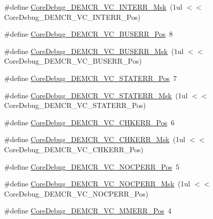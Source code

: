 \begin{DoxyCompactItemize}
\#define \hyperlink{group__CMSIS__CM3__CoreDebug_gad6815d8e3df302d2f0ff2c2c734ed29a}{Core\+Debug\+\_\+\+D\+E\+M\+C\+R\+\_\+\+V\+C\+\_\+\+I\+N\+T\+E\+R\+R\+\_\+\+Msk}~(1ul $<$$<$ Core\+Debug\+\_\+\+D\+E\+M\+C\+R\+\_\+\+V\+C\+\_\+\+I\+N\+T\+E\+R\+R\+\_\+\+Pos)
\item 
\#define \hyperlink{group__CMSIS__CM3__CoreDebug_gab8e3d8f0f9590a51bbf10f6da3ad6933}{Core\+Debug\+\_\+\+D\+E\+M\+C\+R\+\_\+\+V\+C\+\_\+\+B\+U\+S\+E\+R\+R\+\_\+\+Pos}~8
\item 
\#define \hyperlink{group__CMSIS__CM3__CoreDebug_ga9d29546aefe3ca8662a7fe48dd4a5b2b}{Core\+Debug\+\_\+\+D\+E\+M\+C\+R\+\_\+\+V\+C\+\_\+\+B\+U\+S\+E\+R\+R\+\_\+\+Msk}~(1ul $<$$<$ Core\+Debug\+\_\+\+D\+E\+M\+C\+R\+\_\+\+V\+C\+\_\+\+B\+U\+S\+E\+R\+R\+\_\+\+Pos)
\item 
\#define \hyperlink{group__CMSIS__CM3__CoreDebug_ga16f0d3d2ce1e1e8cd762d938ac56c4ac}{Core\+Debug\+\_\+\+D\+E\+M\+C\+R\+\_\+\+V\+C\+\_\+\+S\+T\+A\+T\+E\+R\+R\+\_\+\+Pos}~7
\item 
\#define \hyperlink{group__CMSIS__CM3__CoreDebug_gaa38b947d77672c48bba1280c0a642e19}{Core\+Debug\+\_\+\+D\+E\+M\+C\+R\+\_\+\+V\+C\+\_\+\+S\+T\+A\+T\+E\+R\+R\+\_\+\+Msk}~(1ul $<$$<$ Core\+Debug\+\_\+\+D\+E\+M\+C\+R\+\_\+\+V\+C\+\_\+\+S\+T\+A\+T\+E\+R\+R\+\_\+\+Pos)
\item 
\#define \hyperlink{group__CMSIS__CM3__CoreDebug_ga10fc7c53bca904c128bc8e1a03072d50}{Core\+Debug\+\_\+\+D\+E\+M\+C\+R\+\_\+\+V\+C\+\_\+\+C\+H\+K\+E\+R\+R\+\_\+\+Pos}~6
\item 
\#define \hyperlink{group__CMSIS__CM3__CoreDebug_ga2f98b461d19746ab2febfddebb73da6f}{Core\+Debug\+\_\+\+D\+E\+M\+C\+R\+\_\+\+V\+C\+\_\+\+C\+H\+K\+E\+R\+R\+\_\+\+Msk}~(1ul $<$$<$ Core\+Debug\+\_\+\+D\+E\+M\+C\+R\+\_\+\+V\+C\+\_\+\+C\+H\+K\+E\+R\+R\+\_\+\+Pos)
\item 
\#define \hyperlink{group__CMSIS__CM3__CoreDebug_gac9d13eb2add61f610d5ced1f7ad2adf8}{Core\+Debug\+\_\+\+D\+E\+M\+C\+R\+\_\+\+V\+C\+\_\+\+N\+O\+C\+P\+E\+R\+R\+\_\+\+Pos}~5
\item 
\#define \hyperlink{group__CMSIS__CM3__CoreDebug_ga03ee58b1b02fdbf21612809034562f1c}{Core\+Debug\+\_\+\+D\+E\+M\+C\+R\+\_\+\+V\+C\+\_\+\+N\+O\+C\+P\+E\+R\+R\+\_\+\+Msk}~(1ul $<$$<$ Core\+Debug\+\_\+\+D\+E\+M\+C\+R\+\_\+\+V\+C\+\_\+\+N\+O\+C\+P\+E\+R\+R\+\_\+\+Pos)
\item 
\#define \hyperlink{group__CMSIS__CM3__CoreDebug_ga444454f7c7748e76cd76c3809c887c41}{Core\+Debug\+\_\+\+D\+E\+M\+C\+R\+\_\+\+V\+C\+\_\+\+M\+M\+E\+R\+R\+\_\+\+Pos}~4
\item 
$$
\end{DoxyCompactItemize}
